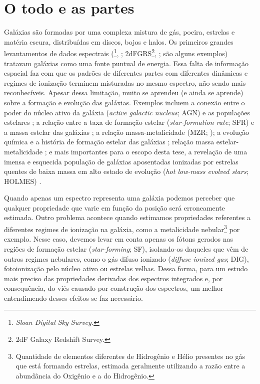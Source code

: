 \section{O todo e as partes}
\label{sec:intro:partes}

Galáxias são formadas por uma complexa mistura de gás, poeira, estrelas e matéria escura, distribuídas em discos, bojos e halos. Os primeiros grandes levantamentos de dados espectrais (\SDSS\footnote{\em Sloan Digital Sky Survey.}, \citealt{York.etal.2000a}; 2dFGRS\footnote{2dF Galaxy Redshift Survey.}, \citealt{Colless.etal.2001a}; são alguns exemplos) tratavam galáxias como uma fonte puntual de energia. Essa falta de informação espacial faz com que os padrões de diferentes partes com diferentes dinâmicas e regimes de ionização terminem misturadas no mesmo espectro, não sendo mais reconhecíveis. Apesar dessa limitação, muito se aprendeu (e ainda se aprende) sobre a formação e evolução das galáxias. Exemplos incluem a conexão entre o poder do núcleo ativo da galáxia ({\em active galactic nucleus}; AGN) e as populações estelares \citep{Kauffmann.etal.2003a}; a relação entre a taxa de formação estelar ({\em star-formation rate}; SFR) e a massa estelar das galáxias \citep{Brinchmann.etal.2004a}; a relação massa-metalicidade (MZR; \citealt{Tremonti.etal.2004a}); a evolução química e a história de formação estelar das galáxias \citep{CidFernandes.etal.2007, Asari.etal.2007a}; relação massa estelar-metalicidade \citep{ValeAsari.etal.2009a}; e mais importantes para o escopo desta tese, a revelação de uma imensa e esquecida população de galáxias aposentadas ionizadas por estrelas quentes de baixa massa em alto estado de evolução ({\em hot low-mass evolved stars}; HOLMES) \citep{Stasinska.etal.2008a, CidFernandes.etal.2010a, CidFernandes.etal.2011a}.

Quando apenas um espectro representa uma galáxia podemos perceber que qualquer propriedade que varie em função da posição será erroneamente estimada. Outro problema acontece quando estimamos propriedades referentes a diferentes regimes de ionização na galáxia, como a metalicidade nebular\footnote{Quantidade de elementos diferentes de Hidrogênio e Hélio presentes no gás que está formando estrelas, estimada geralmente utilizando a razão entre a abundância do Oxigênio e a do Hidrogênio.} por exemplo. Nesse caso, devemos levar em conta apenas os fótons gerados nas regiões de formação estelar ({\em star-forming}; SF), isolando-os daqueles que vêm de outros regimes nebulares, como o gás difuso ionizado ({\em diffuse ionized gas}; DIG), fotoionização pelo núcleo ativo ou estrelas velhas. Dessa forma, para um estudo mais preciso das propriedades derivadas dos espectros integrados e, por consequência, do viés causado por construção dos espectros, um melhor entendimendo desses efeitos se faz necessário.

